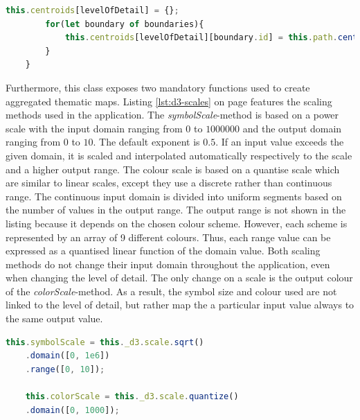 \begin{description}
\begin{lstlisting}[language=JavaScript, caption={Calculate a look-up dictionary for all data items depending on the level of detail.}, label={lst:d3-calculate-centroids}]
        this.centroids[levelOfDetail] = {};
        for(let boundary of boundaries){
            this.centroids[levelOfDetail][boundary.id] = this.path.centroid(boundary);
        }
    }
\end{lstlisting}

Furthermore, this class exposes two mandatory functions used to create aggregated thematic maps. Listing \ref{lst:d3-scales} on page \pageref{lst:d3-scales} features the scaling methods used in the application. The \textit{symbolScale}-method is based on a power scale with the input domain ranging from $0$ to $1000000$ and the output domain ranging from $0$ to $10$. The default exponent is $0.5$. If an input value exceeds the given domain, it is scaled and interpolated automatically respectively to the scale and a higher output range.
The colour scale is based on a quantise scale which are similar to linear scales, except they use a discrete rather than continuous range. The continuous input domain is divided into uniform segments based on the number of values in the output range. The output range is not shown in the listing because it depends on the chosen colour scheme. However, each scheme is represented by an array of 9 different colours. Thus, each range value can be expressed as a quantised linear function of the domain value.
Both scaling methods do not change their input domain throughout the application, even when changing the level of detail. The only change on a scale is the output colour of the \textit{colorScale}-method. As a result, the symbol size and colour used are not linked to the level of detail, but rather map the a particular input value always to the same output value.

\begin{lstlisting}[language=JavaScript, caption={Symbol-scale and colour-scale used for aggregated thematic maps.}, label={lst:d3-scales}]
    this.symbolScale = this._d3.scale.sqrt()
    .domain([0, 1e6])
    .range([0, 10]);

    this.colorScale = this._d3.scale.quantize()
    .domain([0, 1000]);
\end{lstlisting}


\end{description}
